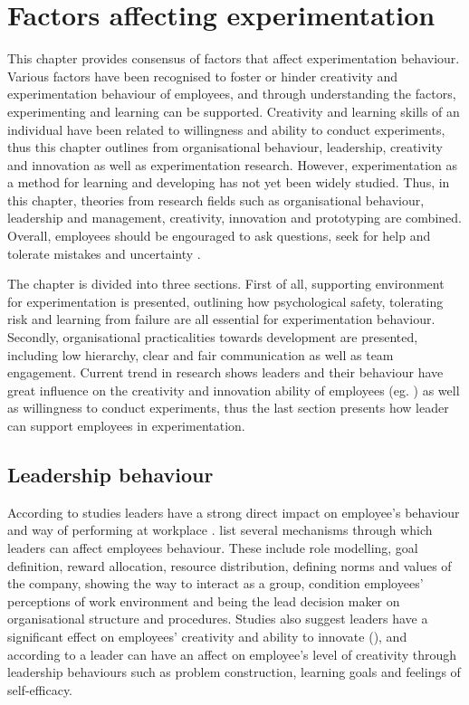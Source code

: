 \chapter{Factors affecting experimentation}
This chapter provides consensus of factors that affect experimentation behaviour. Various factors have been recognised to foster or hinder creativity and experimentation behaviour of employees, and through understanding the factors, experimenting and learning can be supported. Creativity and learning skills of an individual have been related to willingness and ability to conduct experiments, thus this chapter outlines from organisational behaviour, leadership, creativity and innovation as well as experimentation research. However, experimentation as a method for learning and developing has not yet been widely studied. Thus, in this chapter, theories from research fields such as organisational behaviour, leadership and management, creativity, innovation and prototyping are combined. Overall, employees should be engouraged to ask questions, seek for help and tolerate mistakes and uncertainty \citep{edmondson1999psychological}.

The chapter is divided into three sections. First of all, supporting environment for experimentation is presented, outlining how psychological safety, tolerating risk and learning from failure are all essential for experimentation behaviour. Secondly, organisational practicalities towards development are presented, including low hierarchy, clear and fair communication as well as team engagement. Current trend in research shows leaders and their behaviour have great influence on the creativity and innovation ability of employees (eg. \citep{mumford2002leading,jung2001transformational,amabile1998kill}) as well as willingness to conduct experiments, thus the last section presents how leader can support employees in experimentation. 

\section{Leadership behaviour}
According to studies leaders have a strong direct impact on employee's behaviour and way of performing at workplace \citep{katz1978social,redmond1993putting}.  \citet{avolio1988transformational} list several mechanisms through which leaders can affect employees behaviour. These include role modelling, goal definition, reward allocation, resource distribution, defining norms and values of the company, showing the way to interact as a group, condition employees' perceptions of work environment and being the lead decision maker on organisational structure and procedures. Studies also suggest leaders have a significant effect on employees' creativity and ability to innovate (\citep{mumford2002leading,jung2001transformational,amabile1998kill,hennessey19881}), and according to \citet{redmond1993putting} a leader can have an affect on employee's level of creativity through leadership behaviours such as problem construction, learning goals and feelings of self-efficacy. 

